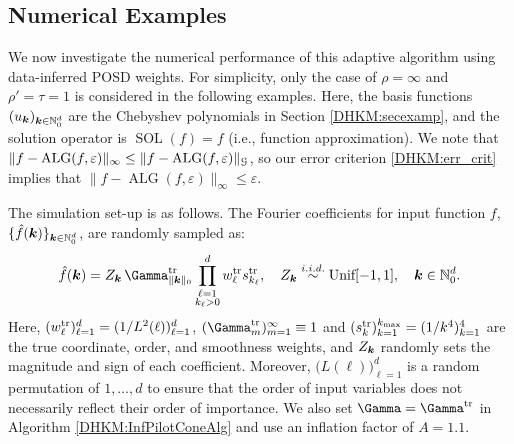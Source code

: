 \documentclass[USenglish]{article}
\theoremstyle{dgthm}
\theoremstyle{dgthm}
\theoremstyle{dgthm}
\theoremstyle{dgthm}
\theoremstyle{dgdef}
\theoremstyle{definition}
\DeclareMathOperator{\DHKMSOL}{SOL}
\DeclareMathOperator{\DHKMALG}{ALG}
\begin{document}
\subsection{Numerical Examples} \label{DHKM:numexamp_sec}

We now investigate the numerical performance of this adaptive algorithm using data-inferred POSD weights. For simplicity, only the case of $\rho = \infty$ and $\rho' = \tau = 1$ is considered in the following examples. Here, the basis functions $(u_{\boldsymbol{k}})_{{\boldsymbol{k}} \in \mathbb{N}_0^d}$ are the Chebyshev polynomials in Section \ref{DHKM:secexamp}, and the solution operator is $\DHKMSOL (f) = f$ (i.e., function approximation). We note that $\|f - \DHKMALG(f,\varepsilon)\|_\infty \le \|f - \DHKMALG(f,\varepsilon)\|_\calG$, so our error criterion \eqref{DHKM:err_crit} implies that $\|f - \DHKMALG(f,\varepsilon)\|_\infty \le \varepsilon$.

The simulation set-up is as follows. The Fourier coefficients for input function $f$, $\{\hat{f}({\boldsymbol{k}})\}_{{\boldsymbol{k}} \in \mathbb{N}_0^d}$, are randomly sampled as:
\begin{equation*}
\hat{f}(\bsk) = Z_{\bsk} \,  {\Gamma}_{\|\bsk\|_0}^{\rm tr} \prod_{\substack{\ell=1\\ k_\ell>0}}^d {w_\ell^{\rm tr}} {s}_{k_\ell}^{\rm tr}, \quad Z_{\bsk} \overset{i.i.d.}{\sim} \text{Unif}[-1, 1], \quad \bsk \in \mathbb{N}_0^d.
\end{equation*}
Here, $(w_\ell^{\rm tr})_{\ell=1}^d = (1/L^2(\ell))_{\ell=1}^d$, $({\Gamma_m^{\rm tr}})_{m=1}^\infty \equiv 1$ and $(s_k^{\rm tr})_{k=1}^{k_{\rm max}} = (1/k^4)_{k=1}^4$ are the true coordinate, order, and smoothness weights, and $Z_{{\boldsymbol{k}}}$ randomly sets the magnitude and sign of each coefficient. Moreover, $\bigl(L(\ell)\bigr)_{\ell=1}^d$ is a random permutation of $1, \ldots, d$ to ensure that the order of input variables does not necessarily reflect their order of importance. We also set $\boldsymbol{\Gamma} = \boldsymbol{\Gamma}^{\rm tr}$ in Algorithm \ref{DHKM:InfPilotConeAlg} and use an inflation factor of $A = 1.1$.
\end{document}
